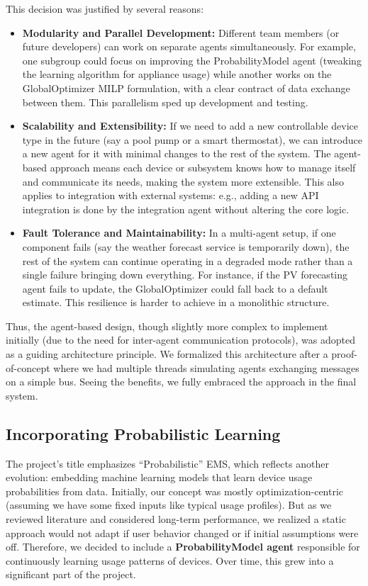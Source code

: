 \documentclass[12pt,a4paper]{article}
\begin{document}
This decision was justified by several reasons:
\begin{itemize}
    \item \textbf{Modularity and Parallel Development:} Different team members (or future developers) can work on separate agents simultaneously. For example, one subgroup could focus on improving the ProbabilityModel agent (tweaking the learning algorithm for appliance usage) while another works on the GlobalOptimizer MILP formulation, with a clear contract of data exchange between them. This parallelism sped up development and testing.
    \item \textbf{Scalability and Extensibility:} If we need to add a new controllable device type in the future (say a pool pump or a smart thermostat), we can introduce a new agent for it with minimal changes to the rest of the system. The agent-based approach means each device or subsystem knows how to manage itself and communicate its needs, making the system more extensible. This also applies to integration with external systems: e.g., adding a new API integration is done by the integration agent without altering the core logic.
    \item \textbf{Fault Tolerance and Maintainability:} In a multi-agent setup, if one component fails (say the weather forecast service is temporarily down), the rest of the system can continue operating in a degraded mode rather than a single failure bringing down everything. For instance, if the PV forecasting agent fails to update, the GlobalOptimizer could fall back to a default estimate. This resilience is harder to achieve in a monolithic structure.
\end{itemize}
Thus, the agent-based design, though slightly more complex to implement initially (due to the need for inter-agent communication protocols), was adopted as a guiding architecture principle. We formalized this architecture after a proof-of-concept where we had multiple threads simulating agents exchanging messages on a simple bus. Seeing the benefits, we fully embraced the approach in the final system.

\subsection{Incorporating Probabilistic Learning}
The project’s title emphasizes “Probabilistic” EMS, which reflects another evolution: embedding machine learning models that learn device usage probabilities from data. Initially, our concept was mostly optimization-centric (assuming we have some fixed inputs like typical usage profiles). But as we reviewed literature and considered long-term performance, we realized a static approach would not adapt if user behavior changed or if initial assumptions were off. Therefore, we decided to include a \textbf{ProbabilityModel agent} responsible for continuously learning usage patterns of devices. Over time, this grew into a significant part of the project.
\end{document}
